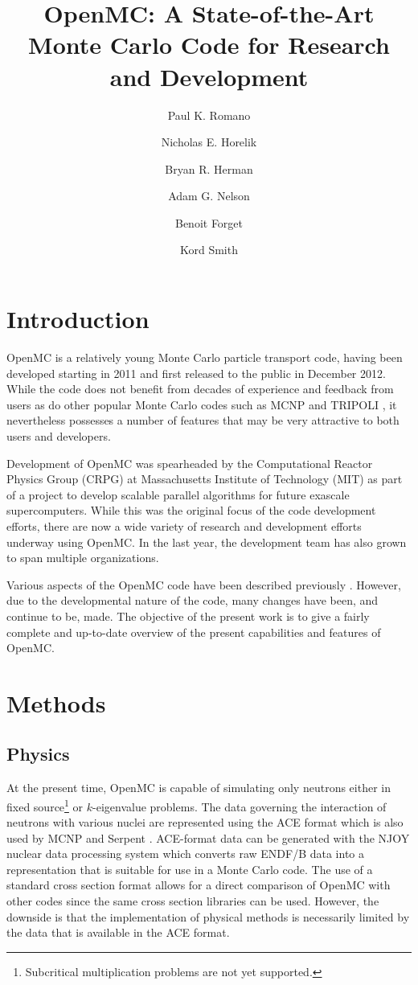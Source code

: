 \documentclass{snamc2013}
\title{OpenMC: A State-of-the-Art Monte Carlo Code for Research and
  Development}
\author[1]{Paul K. Romano}
\author[1]{Nicholas E. Horelik}
\author[1]{Bryan R. Herman}
\author[2]{Adam G. Nelson}
\author[1]{Benoit Forget}
\author[1]{Kord Smith}
\affil[1]{Massachusetts Institute of Technology, Department of Nuclear Science
  and Engineering, 77 Massachusetts Avenue, Cambridge, MA 02139}
\affil[2]{University of Michigan, Department of Nuclear Engineering and
  Radiological Sciences, 2355 Bonisteel Boulevard, Ann Arbor, MI 48104}
\begin{document}
\section{Introduction}

OpenMC is a relatively young Monte Carlo particle transport code, having been
developed starting in 2011 and first released to the public in December
2012. While the code does not benefit from decades of experience and feedback
from users as do other popular Monte Carlo codes such as MCNP
\cite{lanl-brown-2010} and TRIPOLI \cite{phytra-diop-2007}, it nevertheless
possesses a number of features that may be very attractive to both users and
developers.

Development of OpenMC was spearheaded by the Computational Reactor Physics Group
(CRPG) at Massachusetts Institute of Technology (MIT) as part of a project to
develop scalable parallel algorithms for future exascale supercomputers. While
this was the original focus of the code development efforts, there are now a
wide variety of research and development efforts underway using OpenMC. In the
last year, the development team has also grown to span multiple
organizations.

Various aspects of the OpenMC code have been described previously
\cite{ane-romano-2013, mc-romano-2013}. However, due to the developmental nature
of the code, many changes have been, and continue to be, made. The objective of
the present work is to give a fairly complete and up-to-date overview of the
present capabilities and features of OpenMC.

\section{Methods}

\subsection{Physics}

At the present time, OpenMC is capable of simulating only neutrons either in
fixed source\footnote{Subcritical multiplication problems are not yet
  supported.} or $k$-eigenvalue problems. The data governing the interaction of
neutrons with various nuclei are represented using the ACE format
\cite{lanl-x5-2008-ace} which is also used by MCNP and Serpent
\cite{vtt-leppanen-2012}. ACE-format data can be generated with the NJOY nuclear
data processing system \cite{lanl-macfarlane-1994} which converts raw ENDF/B
data into a representation that is suitable for use in a Monte Carlo code. The
use of a standard cross section format allows for a direct comparison of OpenMC
with other codes since the same cross section libraries can be used. However,
the downside is that the implementation of physical methods is necessarily
limited by the data that is available in the ACE format.
\end{document}
